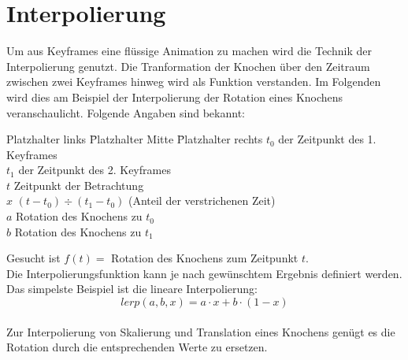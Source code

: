 \section{Interpolierung}
\label{sec:interpolierung}
%
Um aus Keyframes eine flüssige Animation zu machen wird die Technik der Interpolierung genutzt. Die Tranformation der Knochen über den Zeitraum zwischen zwei Keyframes hinweg wird als Funktion verstanden. Im Folgenden wird dies am Beispiel der Interpolierung der Rotation eines Knochens veranschaulicht. Folgende Angaben sind bekannt:
\begin{tabbing}
	Platzhalter links \quad \= Platzhalter Mitte \quad \= Platzhalter rechts \kill
	$t_0$   \> der Zeitpunkt des 1. Keyframes 	\\
	$t_1$   \> der Zeitpunkt des 2. Keyframes	\\
	$t$		\> Zeitpunkt der Betrachtung		\\
	$x$ 	\> $(t-t_0) \div (t_1 - t_0)$ (Anteil der verstrichenen Zeit)		\\
	$a$     \> Rotation des Knochens zu $t_0$	\\
	$b$     \> Rotation des Knochens zu $t_1$
\end{tabbing}
Gesucht ist $f(t) =$ Rotation des Knochens zum Zeitpunkt $t$.\\
Die Interpolierungsfunktion kann je nach gewünschtem Ergebnis definiert werden. Das simpelste Beispiel ist die lineare Interpolierung:\\
\begin{equation}
	lerp(a,b,x) = a \cdot x + b \cdot (1-x) 
\end{equation}\\
%
Zur Interpolierung von Skalierung und Translation eines Knochens genügt es die Rotation durch die entsprechenden Werte zu ersetzen. 
